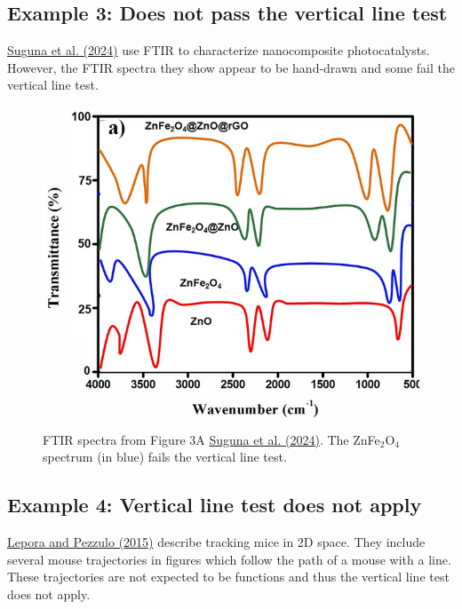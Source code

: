 \documentclass[letterpaper, 12pt]{article}
\begin{document}
\pagebreak

\subsection*{Example 3: Does not pass the vertical line test}

\href{https://doi.org/10.1007/s10854-024-13064-8}{Suguna et al. (2024)} use FTIR to characterize nanocomposite photocatalysts. However, the FTIR spectra they show appear to be hand-drawn and some fail the vertical line test.

\begin{figure}[h!tbp]
    \centering
    \includegraphics[width=\textwidth]{img/vertical_line/suguna_ftir.png}
    \caption*{FTIR spectra from Figure 3A \href{https://doi.org/10.1007/s10854-024-13064-8}{Suguna et al. (2024)}. The ZnFe$_2$O$_4$ spectrum (in blue) fails the vertical line test.}
\end{figure}

\pagebreak

\subsection*{Example 4: Vertical line test does not apply}

\href{https://doi.org/10.1371/journal.pcbi.1004110}{Lepora and Pezzulo (2015)} describe tracking mice in 2D space. They include several mouse trajectories in figures which follow the path of a mouse with a line. These trajectories are not expected to be functions and thus the vertical line test does not apply.
\end{document}
